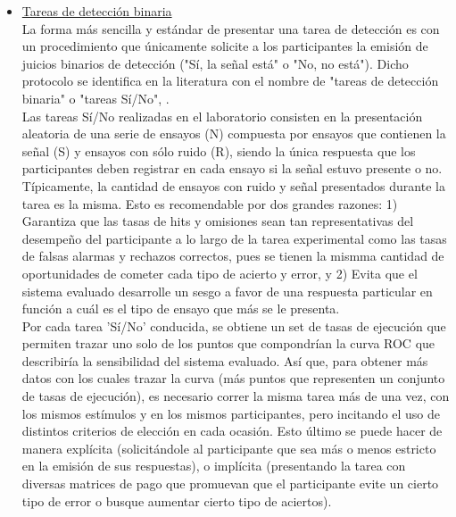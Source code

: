 \begin{itemize}
\item \underline{Tareas de detección binaria}\\

La forma más sencilla y estándar de presentar una tarea de detección es con un procedimiento que únicamente solicite a los participantes la emisión de juicios binarios de detección ("Sí, la señal está" o "No, no está"). Dicho protocolo se identifica en la literatura con el nombre de "tareas de detección binaria" o "tareas Sí/No", \parencite{McNicol2}.\\

Las tareas Sí/No realizadas en el laboratorio consisten en la presentación aleatoria de una serie de ensayos (N) compuesta por ensayos que contienen la señal (S) y ensayos con sólo ruido (R), siendo la única respuesta que los participantes deben registrar en cada ensayo si la señal estuvo presente o no. Típicamente, la cantidad de ensayos con ruido y señal presentados durante la tarea es la misma. Esto es recomendable por dos grandes razones: 1) Garantiza que las tasas de hits y omisiones sean tan representativas del desempeño del participante a lo largo de la tarea experimental como las tasas de falsas alarmas y rechazos correctos, pues se tienen la mismma cantidad de oportunidades de cometer cada tipo de acierto y error, y 2) Evita que el sistema evaluado desarrolle un sesgo a favor de una respuesta particular en función a cuál es el tipo de ensayo que más se le presenta.\\

Por cada tarea 'Sí/No' conducida, se obtiene un set de tasas de ejecución que permiten trazar uno solo de los puntos que compondrían la curva ROC que describiría la sensibilidad del sistema evaluado. Así que, para obtener más datos con los cuales trazar la curva (más puntos que representen un conjunto de tasas de ejecución), es necesario correr la misma tarea más de una vez, con los mismos estímulos y en los mismos participantes, pero incitando el uso de distintos criterios de elección en cada ocasión. Esto último se puede hacer de manera explícita (solicitándole al participante que sea más o menos estricto en la emisión de sus respuestas), o implícita (presentando la tarea con diversas matrices de pago que promuevan que el participante evite un cierto tipo de error o busque aumentar cierto tipo de aciertos).\\


\end{itemize}
